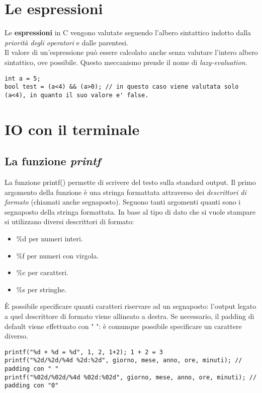 \section{Le espressioni}
Le \textbf{espressioni} in C vengono valutate seguendo l'albero sintattico indotto dalla \textit{priorità degli operatori} e dalle parentesi.\\
Il valore di un'espressione può essere calcolato anche senza valutare l'intero albero sintattico, ove possibile. Questo meccanismo prende il nome di \textit{lazy-evaluation}.
\begin{lstlisting}
int a = 5;
bool test = (a<4) && (a>0); // in questo caso viene valutata solo (a<4), in quanto il suo valore e' false.
\end{lstlisting}

\section{IO con il terminale}

\subsection{La funzione \textit{printf}}
La funzione \colorbox{light-gray}{printf()} permette di scrivere del testo sulla standard output. Il primo argomento della funzione è una stringa formattata attraverso dei \textit{descrittori di formato} (chiamati anche segnaposto). Seguono tanti argomenti quanti sono i segnaposto della stringa formattata.
In base al tipo di dato che si vuole stampare si utilizzano diversi descrittori di formato:
\begin{itemize}[noitemsep]
	\item \colorbox{light-gray}{\%d} per numeri interi.
	\item \colorbox{light-gray}{\%f} per numeri con virgola.
	\item \colorbox{light-gray}{\%c} per caratteri.
	\item \colorbox{light-gray}{\%s} per stringhe.
\end{itemize}
\`{E} possibile specificare quanti caratteri riservare ad un segnaposto: l'output legato a quel descrittore di formato viene allineato a destra. Se necessario, il padding di default viene effettuato con " ": è comunque possibile specificare un carattere diverso.

\begin{lstlisting}[title={Esempi di output con printf}]
printf("%d + %d = %d", 1, 2, 1+2); 1 + 2 = 3
printf("%2d/%2d/%4d %2d:%2d", giorno, mese, anno, ore, minuti); // padding con " "
printf("%02d/%02d/%4d %02d:%02d", giorno, mese, anno, ore, minuti); // padding con "0"
\end{lstlisting}

